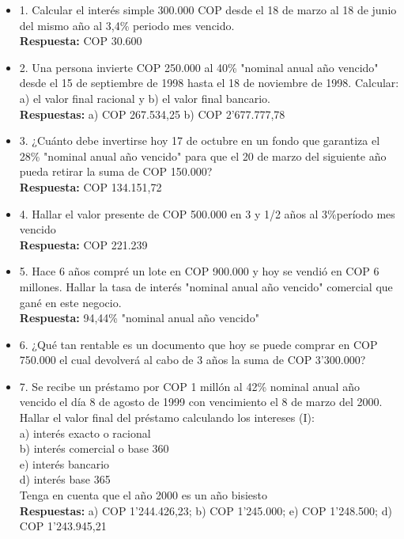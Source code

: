 \begin{itemize}
 \item 1. Calcular el interés simple 300.000 COP desde el 18 de marzo al 18 de junio del mismo año al 3,4\% periodo mes vencido.\\
       \textbf{Respuesta:} COP 30.600
       \medskip

 \item 2. Una persona invierte COP 250.000 al 40\% "nominal anual año vencido" desde el 15 de septiembre de 1998 hasta el 18 de noviembre de 1998. Calcular:
       \\
       a) el valor final racional y
       b) el valor final bancario.
       \\
       \textbf{Respuestas:} a) COP 267.534,25  b) COP 2'677.777,78
       \medskip

 \item 3. ¿Cuánto debe invertirse hoy 17 de octubre en un fondo que garantiza el 28\% "nominal anual año vencido" para que el 20 de marzo del siguiente año pueda retirar la suma de COP 150.000?\\
       \textbf{Respuesta:} COP 134.151,72
       \medskip


 \item 4. Hallar el valor presente de COP 500.000 en 3 y 1/2 años al 3\%período mes vencido\\
       \textbf{Respuesta:} COP 221.239
       \medskip

 \item 5. Hace 6 años compré un lote en COP 900.000 y hoy se vendió en COP 6 millones. Hallar la tasa de interés "nominal anual año vencido" comercial que gané en este negocio.\\
       \textbf{Respuesta: }94,44\% "nominal anual año vencido"
       \medskip

 \item 6. ¿Qué tan rentable es un documento que hoy se puede comprar en COP 750.000 el cual devolverá al cabo de 3 años la suma de COP 3'300.000?\\
       \medskip

 \item 7. Se recibe un préstamo por  COP  1 millón al 42\% nominal anual año vencido el día 8 de agosto de 1999 con vencimiento el 8 de marzo del 2000. Hallar el valor final del préstamo calculando los intereses (I):\\

       a) interés exacto o racional\\
       b) interés comercial o base 360\\
       e) interés bancario\\
       d) interés base 365\\
       Tenga en cuenta que el año 2000 es un año bisiesto\\
       \textbf{ Respuestas:} a) COP 1'244.426,23; b) COP 1'245.000; e) COP 1'248.500; d) COP 1'243.945,21
       \medskip


\end{itemize}
